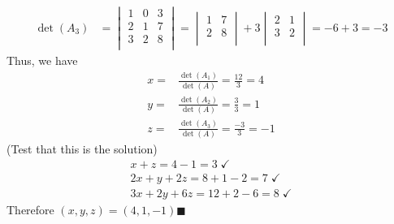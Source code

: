 \documentclass{article}
\begin{document}
\begin{align*}
  \det (A_3)&=\begin{vmatrix}
    1 &0  &3   \\
    2&1  &7   \\
    3&2  &8   \\
  \end{vmatrix}=\begin{vmatrix}
    1 &7   \\
     2&8   \\
  \end{vmatrix}+3\begin{vmatrix}
    2 &1   \\
     3&2   \\
  \end{vmatrix}=-6+3=-3
\end{align*}
Thus, we have
\begin{align*}
  x=&\frac{\det \left( A_1 \right) }{\det \left( A \right) }=\frac{12}{3}=4\\
  y=&\frac{\det \left( A_2 \right) }{\det \left( A \right) }=\frac{3}{3}=1\\
  z=&\frac{\det \left( A_3 \right) }{\det \left( A \right) }=\frac{-3}{3}=-1
\end{align*}
(Test that this is the solution)
\[
  \begin{array}{c}
    x+z=4-1=3\;\checkmark\\
    2x+y+2z=8+1-2=7\;\checkmark\\
    3x+2y+6z=12+2-6=8\;\checkmark
  \end{array}
\]
Therefore \((x,y,z)=(4,1,-1)\)\hfill\(\blacksquare\)
\end{document}
